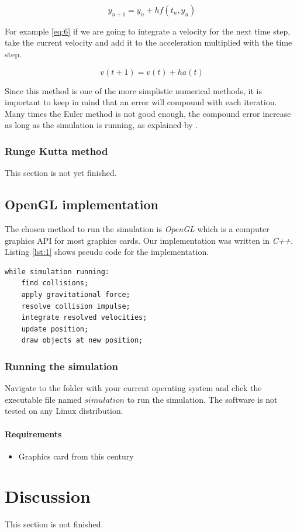 \documentclass[a4paper,12pt]{report}
\begin{document}
\begin{equation}
y_{n+1}=y_{n}+hf(t_n, y_n)
\label{eq:5}
\end{equation}

For example \ref{eq:6} if we are going to integrate a velocity for the next time step, take the current velocity and add it to the acceleration multiplied with the time step.

\begin{equation}
v(t+1)=v(t)+ha(t)
\label{eq:6}
\end{equation}

Since this method is one of the more simplistic numerical methods, it is important to keep in mind that an error will compound with each iteration. Many times the Euler method is not good enough, the compound error increase as long as the simulation is running, as explained by \cite{gog}.

\subsection{Runge Kutta method}

This section is not yet finished.

\section{OpenGL implementation}

The chosen method to run the simulation is \emph{OpenGL} which is a computer graphics API for most graphics cards. Our implementation was written in \emph{C++}. Listing \ref{lst:1} shows pseudo code for the implementation.

\begin{lstlisting}[caption={Pseudo code for the simulation loop.}, label=lst:1]
while simulation running:
    find collisions;
    apply gravitational force;
    resolve collision impulse;
    integrate resolved velocities;
    update position;
    draw objects at new position;
\end{lstlisting}

\subsection{Running the simulation}
Navigate to the folder with your current operating system and click the executable file named $simulation$ to run the simulation. The software is not tested on any Linux distribution.

\subsubsection{Requirements}
\begin{itemize}
    \item Graphics card from this century
\end{itemize}


\chapter{Discussion}

This section is not finished.






\end{document}
